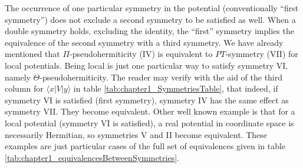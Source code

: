 The occurrence of one particular symmetry in the potential (conventionally  ``first symmetry'')
does not exclude a second symmetry to be satisfied as well.
When a double symmetry holds, excluding the identity,  the ``first'' symmetry  implies the equivalence of the second symmetry with a third symmetry.
We have already mentioned that $\Pi$-pseudohermiticity (IV) is equivalent to $PT$-symmetry (VII) for local potentials.
Being local is just one particular way to satisfy symmetry VI, namely $\Theta$-pseudohermiticity. The reader may verify with the aid of
the third column for $\langle x|V|y\rangle$  in table \ref{tab:chapter1_SymmetriesTable}, that indeed, if symmetry VI is satisfied (first symmetry), symmetry IV has the same effect as symmetry VII.
They become equivalent. Other well known example is  that for a local potential (symmetry VI is satisfied), a real potential in coordinate space  is necessarily Hermitian,
so symmetries V and II become equivalent.
These examples are just particular cases of the full set of equivalences given in table \ref{tab:chapter1_equivalencesBetweenSymmetries}.

\begin{table}
  \caption{Equivalences among symmetries for the potential elements.
  Given the symmetry of the upper row, the table provides the equivalent symmetries.
  For example, if II is satisfied, then III=IV holds. In words, if the potential is Hermitian,  parity symmetry amounts to
  parity pseudohermiticity. In terms of the matrix elements of the potential, if  $\langle x|V|y\rangle=\langle y|V|x\rangle^*$ and also
  $\langle x|V|y\rangle=\langle -x|V|-y\rangle$, $\forall (x,y)$, then $\langle x|V|y\rangle=\langle -y|V|-x\rangle^*$ holds as well. One may proceed similarly for all other relations.
  The commutation with the identity (I) is excluded as this symmetry is satisfied by all potentials.\vspace*{.2cm}
  \label{tab:chapter1_equivalencesBetweenSymmetries}}
  \centering

\end{table}



